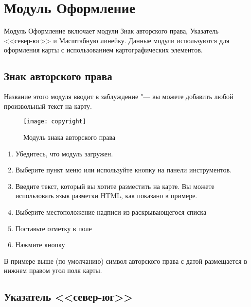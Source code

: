 
\section{Модуль Оформление}


Модуль Оформление включает модули Знак авторского права, Указатель
<<север-юг>> и Масштабную линейку. Данные модули используются для
оформления карты с использованием картографических элементов.

\subsection{Знак авторского права}\label{copyrightlabel}

Название этого модуля вводит в заблуждение "--- вы можете добавить любой
произвольный текст на карту.

\begin{figure}[ht]
   \centering
   \texttt{[image: copyright]}
   \caption{Модуль знака авторского права \wincaption}\label{fig:copyright}
\end{figure}

\begin{enumerate}
\item Убедитесь, что модуль загружен.
\item Выберите пункт меню  \arrow {}
\arrow {} или
используйте кнопку 
на панели инструментов.
\item Введите текст, который вы хотите разместить на карте. Вы можете
использовать язык разметки HTML, как показано в примере.
\item Выберите местоположение надписи из раскрывающегося списка
\item Поставьте отметку в поле 
\item Нажмите кнопку 
\end{enumerate}

В примере выше (по умолчанию) символ авторского права с датой размещается
в нижнем правом угол поля карты.

\subsection{Указатель <<север-юг>>}\label{northarrow}

